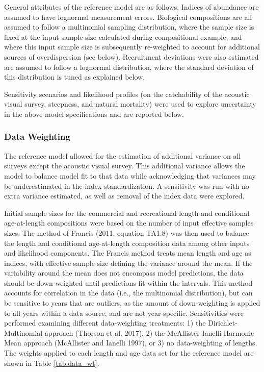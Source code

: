 \documentclass[11pt,
  english,
  letterpaper,
]{article}
\begin{document}
General attributes of the reference model are as follows. Indices of abundance are assumed to have lognormal measurement errors. Biological compositions are all assumed to follow a multinomial sampling distribution, where the sample size is fixed at the input sample size calculated during compositional example, and where this input sample size is subsequently re-weighted to account for additional sources of overdispersion (see below). Recruitment deviations were also estimated are assumed to follow a lognormal distribution, where the standard deviation of this distribution is tuned as explained below.

Sensitivity scenarios and likelihood profiles (on the catchability of the acoustic visual survey, steepness, and natural mortality) were used to explore uncertainty in the above model specifications and are reported below.

\hypertarget{data-weighting}{%
\subsubsection{Data Weighting}\label{data-weighting}}

The reference model allowed for the estimation of additional variance on all surveys except the acoustic visual survey. This additional variance allows the model to balance model fit to that data while acknowledging that variances may be underestimated in the index standardization. A sensitivity was run with no extra variance estimated, as well as removal of the index data were explored.

Initial sample sizes for the commercial and recreational length and conditional age-at-length compositions were based on the number of input effective samples sizes. The method of Francis (2011, equation TA1.8) was then used to balance the length and conditional age-at-length composition data among other inputs and likelihood components. The Francis method treats mean length and age as indices, with effective sample size defining the variance around the mean. If the variability around the mean does not encompass model predictions, the data should be down-weighted until predictions fit within the intervals. This method accounts for correlation in the data (i.e., the multinomial distribution), but can be sensitive to years that are outliers, as the amount of down-weighting is applied to all years within a data source, and are not year-specific. Sensitivities were performed examining different data-weighting treatments: 1) the Dirichlet-Multinomial approach (Thorson et al. 2017), 2) the McAllister-Ianelli Harmonic Mean approach (McAllister and Ianelli 1997), or 3) no data-weighting of lengths. The weights applied to each length and age data set for the reference model are shown in Table \ref{tab:data_wt}.
\end{document}
